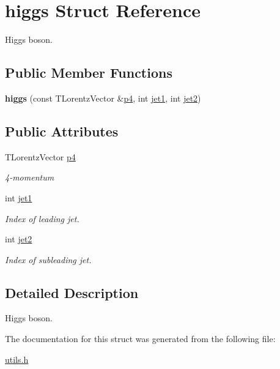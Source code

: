 \hypertarget{structhiggs}{}\section{higgs Struct Reference}
\label{structhiggs}


Higgs boson.  


\subsection*{Public Member Functions}
\begin{DoxyCompactItemize}
\item 
\mbox{\label{structhiggs_a762d9e499f159546b5a7be6b71e1a979}} 
{\bfseries higgs} (const T\+Lorentz\+Vector \&\mbox{\hyperlink{structhiggs_a1ab789e6d7ff5eb716b0816e92991844}{p4}}, int \mbox{\hyperlink{structhiggs_a937bf1a9f4a028f74241e29b49319285}{jet1}}, int \mbox{\hyperlink{structhiggs_a10b2fc30286f40fe7aaeddb5dca6af1b}{jet2}})
\end{DoxyCompactItemize}
\subsection*{Public Attributes}
\begin{DoxyCompactItemize}
\item 
\mbox{\label{structhiggs_a1ab789e6d7ff5eb716b0816e92991844}} 
T\+Lorentz\+Vector \mbox{\hyperlink{structhiggs_a1ab789e6d7ff5eb716b0816e92991844}{p4}}
\begin{DoxyCompactList}\small\item\em 4-\/momentum \end{DoxyCompactList}\item 
\mbox{\label{structhiggs_a937bf1a9f4a028f74241e29b49319285}} 
int \mbox{\hyperlink{structhiggs_a937bf1a9f4a028f74241e29b49319285}{jet1}}
\begin{DoxyCompactList}\small\item\em Index of leading jet. \end{DoxyCompactList}\item 
\mbox{\label{structhiggs_a10b2fc30286f40fe7aaeddb5dca6af1b}} 
int \mbox{\hyperlink{structhiggs_a10b2fc30286f40fe7aaeddb5dca6af1b}{jet2}}
\begin{DoxyCompactList}\small\item\em Index of subleading jet. \end{DoxyCompactList}\end{DoxyCompactItemize}


\subsection{Detailed Description}
Higgs boson. 

The documentation for this struct was generated from the following file\+:\begin{DoxyCompactItemize}
\item 
\mbox{\hyperlink{utils_8h}{utils.\+h}}\end{DoxyCompactItemize}
